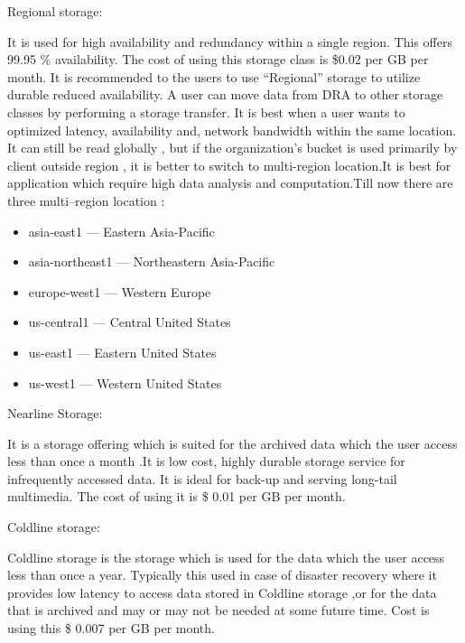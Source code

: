 \documentclass[9pt,twocolumn,twoside]{../../styles/osajnl}
\begin{document}
\begin{flushleft}
Regional storage:

It is used for high availability and redundancy within a single region. This offers 99.95 \% availability. The cost of using this storage class is \$0.02 per GB per month. It is recommended to the users to use “Regional”  storage to utilize durable  reduced  availability. A user can move data from DRA to other storage classes by performing a storage transfer. It is best when a user wants to optimized latency, availability and, network bandwidth within the same location. It can still be read globally , but if the organization's bucket is used primarily by client outside region , it is better to switch to multi-region location.It is best for application which require high data analysis and computation.Till now there are three multi–region location :

		\begin{itemize}

			\item asia-east1 — Eastern Asia-Pacific
			\item asia-northeast1 — Northeastern Asia-Pacific
			\item europe-west1 — Western Europe
			\item us-central1 — Central United States
			\item us-east1 — Eastern United States
			\item us-west1 — Western United States

		\end{itemize}
\end{flushleft}


\begin{flushleft}
 Nearline Storage:

It is a storage offering which is suited for the archived data which the user access less than once a month .It is low cost, highly durable storage service for infrequently accessed data. It is ideal for back-up and serving long-tail multimedia. The cost of using it is \$ 0.01 per GB per month. 

\end{flushleft}


\begin{flushleft}
 Coldline storage:

Coldline storage is the storage which is used for the data which the user access less than once a year. Typically this used in case of disaster recovery where it provides low latency to access  data stored in Coldline storage ,or for the data that is archived and may or may not be needed at some future time. Cost is using this \$  0.007 per GB per month.


\end{flushleft}
\end{document}
